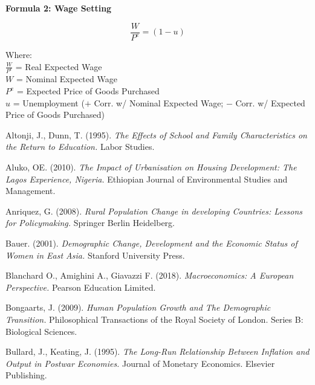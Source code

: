 \documentclass[11pt, english]{article}
\begin{document}
	\newpage

	\textbf{Formula 2: Wage Setting}

	$$\frac{W}{P^e}=(1-u)$$

	Where:\\
	$\frac{W}{P^e}$ = Real Expected Wage\\
	$W$ = Nominal Expected Wage\\
	$P^e$ = Expected Price of Goods Purchased\\
	$u$ = Unemployment ($+$ Corr. w/ Nominal Expected Wage; $-$ Corr. w/ Expected Price of Goods Purchased)

\newpage

	\renewcommand\refname{Bibliography}

	\begin{thebibliography}{9}

               	Altonji, J., Dunn, T. (1995).  
		\textsl{The Effects of School and Family Characteristics on the Return to Education.}
		Labor Studies.
			
                Aluko, OE. (2010).                                     
                \textsl{The Impact of Urbanisation on Housing Development: The Lagos Experience, Nigeria.}                                              
      		Ethiopian Journal of Environmental Studies and Management.
	
                Anriquez, G. (2008).
                \textsl{Rural Population Change in developing Countries: Lessons for Policymaking.}                                              
      		Springer Berlin Heidelberg.
	
                Bauer. (2001).
		\textsl{Demographic Change, Development and the Economic Status of Women in East Asia.}
		Stanford University Press.
			
                Blanchard O., Amighini A., Giavazzi F. (2018).
                \textsl{Macroeconomics: A European Perspective.}
      		Pearson Education Limited.
	
                Bongaarts, J. (2009).           
                \textsl{Human Population Growth and The Demographic Transition.}
     		Philosophical Transactions of the Royal Society of London. Series B: Biological Sciences. 

                Bullard, J., Keating, J. (1995).
		\textsl{The Long-Run Relationship Between Inflation and Output in Postwar Economies.}
		Journal of Monetary Economics. Elsevier Publishing.
			

\end{thebibliography}
\end{document}
